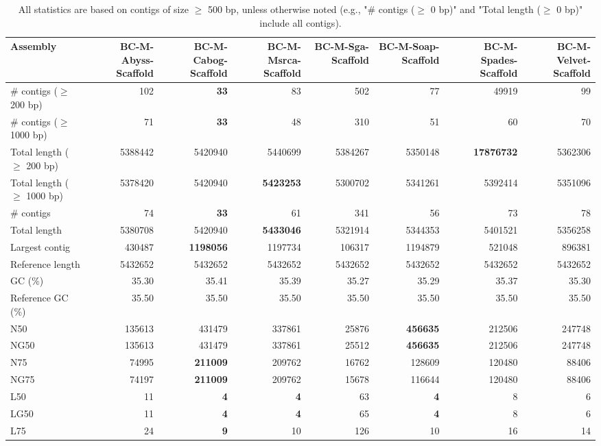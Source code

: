 \documentclass[12pt,a4paper]{article}
\begin{document}
\begin{table}[ht]
\begin{center}
\caption{All statistics are based on contigs of size $\geq$ 500 bp, unless otherwise noted (e.g., "\# contigs ($\geq$ 0 bp)" and "Total length ($\geq$ 0 bp)" include all contigs).}
\begin{tabular}{|l*{7}{|r}|}
\hline
Assembly & BC-M-Abyss-Scaffold & BC-M-Cabog-Scaffold & BC-M-Msrca-Scaffold & BC-M-Sga-Scaffold & BC-M-Soap-Scaffold & BC-M-Spades-Scaffold & BC-M-Velvet-Scaffold \\ \hline
\# contigs ($\geq$ 200 bp) & 102 & {\bf 33} & 83 & 502 & 77 & 49919 & 99 \\ \hline
\# contigs ($\geq$ 1000 bp) & 71 & {\bf 33} & 48 & 310 & 51 & 60 & 70 \\ \hline
Total length ($\geq$ 200 bp) & 5388442 & 5420940 & 5440699 & 5384267 & 5350148 & {\bf 17876732} & 5362306 \\ \hline
Total length ($\geq$ 1000 bp) & 5378420 & 5420940 & {\bf 5423253} & 5300702 & 5341261 & 5392414 & 5351096 \\ \hline
\# contigs & 74 & {\bf 33} & 61 & 341 & 56 & 73 & 78 \\ \hline
Total length & 5380708 & 5420940 & {\bf 5433046} & 5321914 & 5344353 & 5401521 & 5356258 \\ \hline
Largest contig & 430487 & {\bf 1198056} & 1197734 & 106317 & 1194879 & 521048 & 896381 \\ \hline
Reference length & 5432652 & 5432652 & 5432652 & 5432652 & 5432652 & 5432652 & 5432652 \\ \hline
GC (\%) & 35.30 & 35.41 & 35.39 & 35.27 & 35.29 & 35.37 & 35.30 \\ \hline
Reference GC (\%) & 35.50 & 35.50 & 35.50 & 35.50 & 35.50 & 35.50 & 35.50 \\ \hline
N50 & 135613 & 431479 & 337861 & 25876 & {\bf 456635} & 212506 & 247748 \\ \hline
NG50 & 135613 & 431479 & 337861 & 25512 & {\bf 456635} & 212506 & 247748 \\ \hline
N75 & 74995 & {\bf 211009} & 209762 & 16762 & 128609 & 120480 & 88406 \\ \hline
NG75 & 74197 & {\bf 211009} & 209762 & 15678 & 116644 & 120480 & 88406 \\ \hline
L50 & 11 & {\bf 4} & {\bf 4} & 63 & {\bf 4} & 8 & 6 \\ \hline
LG50 & 11 & {\bf 4} & {\bf 4} & 65 & {\bf 4} & 8 & 6 \\ \hline
L75 & 24 & {\bf 9} & 10 & 126 & 10 & 16 & 14 \\ \hline

\end{tabular}
\end{center}
\end{table}
\end{document}
